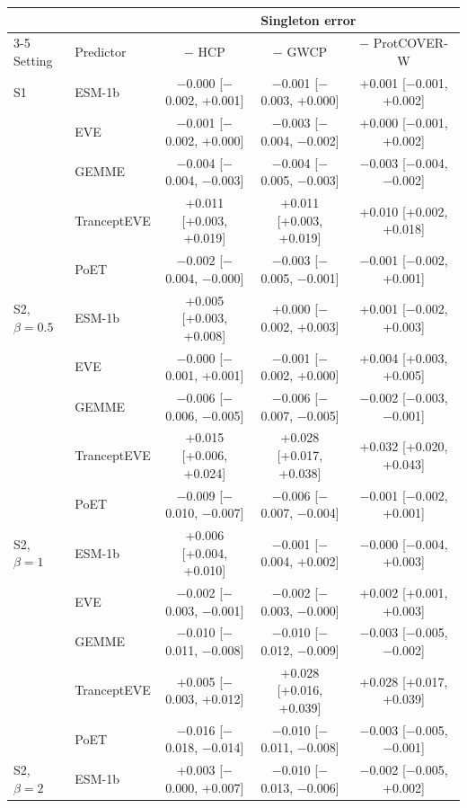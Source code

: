 \begin{tabular}{llccc}
\toprule
 & & \multicolumn{3}{c}{Singleton error} \\
\cmidrule(lr){3-5}
Setting & Predictor & $-$ HCP & $-$ GWCP & $-$ ProtCOVER-W \\
\midrule
S1 & ESM-1b & $-$0.000 [$-$0.002, +0.001] & $-$0.001 [$-$0.003, +0.000] & +0.001 [$-$0.001, +0.002] \\
 & EVE & $-$0.001 [$-$0.002, +0.000] & $-$0.003 [$-$0.004, $-$0.002] & +0.000 [$-$0.001, +0.002] \\
 & GEMME & $-$0.004 [$-$0.004, $-$0.003] & $-$0.004 [$-$0.005, $-$0.003] & $-$0.003 [$-$0.004, $-$0.002] \\
 & TranceptEVE & +0.011 [+0.003, +0.019] & +0.011 [+0.003, +0.019] & +0.010 [+0.002, +0.018] \\
 & PoET & $-$0.002 [$-$0.004, $-$0.000] & $-$0.003 [$-$0.005, $-$0.001] & $-$0.001 [$-$0.002, +0.001] \\
\midrule
S2, $\beta=0.5$ & ESM-1b & +0.005 [+0.003, +0.008] & +0.000 [$-$0.002, +0.003] & +0.001 [$-$0.002, +0.003] \\
 & EVE & $-$0.000 [$-$0.001, +0.001] & $-$0.001 [$-$0.002, +0.000] & +0.004 [+0.003, +0.005] \\
 & GEMME & $-$0.006 [$-$0.006, $-$0.005] & $-$0.006 [$-$0.007, $-$0.005] & $-$0.002 [$-$0.003, $-$0.001] \\
 & TranceptEVE & +0.015 [+0.006, +0.024] & +0.028 [+0.017, +0.038] & +0.032 [+0.020, +0.043] \\
 & PoET & $-$0.009 [$-$0.010, $-$0.007] & $-$0.006 [$-$0.007, $-$0.004] & $-$0.001 [$-$0.002, +0.001] \\
\midrule
S2, $\beta=1$ & ESM-1b & +0.006 [+0.004, +0.010] & $-$0.001 [$-$0.004, +0.002] & $-$0.000 [$-$0.004, +0.003] \\
 & EVE & $-$0.002 [$-$0.003, $-$0.001] & $-$0.002 [$-$0.003, $-$0.000] & +0.002 [+0.001, +0.003] \\
 & GEMME & $-$0.010 [$-$0.011, $-$0.008] & $-$0.010 [$-$0.012, $-$0.009] & $-$0.003 [$-$0.005, $-$0.002] \\
 & TranceptEVE & +0.005 [$-$0.003, +0.012] & +0.028 [+0.016, +0.039] & +0.028 [+0.017, +0.039] \\
 & PoET & $-$0.016 [$-$0.018, $-$0.014] & $-$0.010 [$-$0.011, $-$0.008] & $-$0.003 [$-$0.005, $-$0.001] \\
\midrule
S2, $\beta=2$ & ESM-1b & +0.003 [$-$0.000, +0.007] & $-$0.010 [$-$0.013, $-$0.006] & $-$0.002 [$-$0.005, +0.002] \\

\end{tabular}
